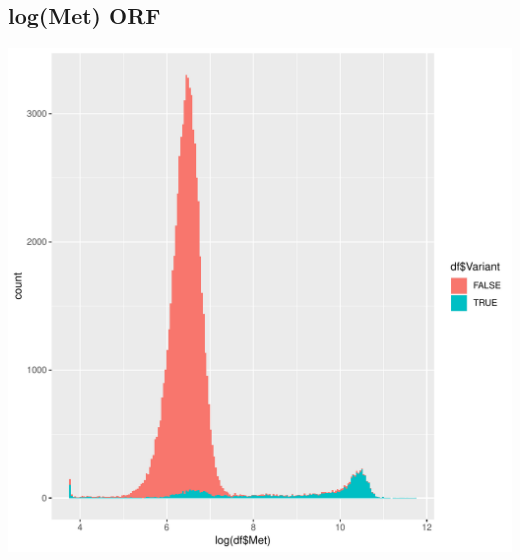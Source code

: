 \documentclass{article}\usepackage[]{graphicx}\usepackage[]{color}
\newenvironment{knitrout}{}{} %
\begin{document}
\subsection{log(Met) ORF}
\begin{knitrout}
\color{fgcolor}

{\centering \includegraphics[width=1\linewidth]{figure/minimal-dens_ORF_met-1} 

}



\end{knitrout}
\clearpage
\end{document}
